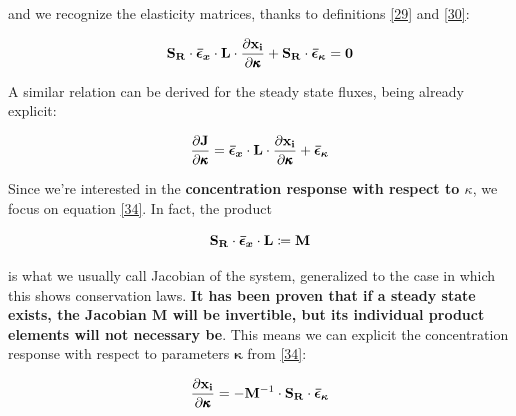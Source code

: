 \documentclass{article}
\begin{document}
	\begin{flushleft}
		and we recognize the elasticity matrices, thanks to definitions \eqref{29} and \eqref{30}:
	\end{flushleft}
	
	\begin{center}
		\begin{equation}
			\mathbf{S_R} \cdot \bm{\Bar{\epsilon}_x} \cdot \mathbf{L}
			\cdot \frac{\partial \mathbf{x_i}}{\partial \pmb{\kappa}}
			+ \mathbf{S_R} \cdot \bm{\Bar{\epsilon}_{\kappa}} = \mathbf{0}
			\label{34}
		\end{equation}
	\end{center}
	
	\begin{flushleft}
		A similar relation can be derived for the steady state fluxes, being already explicit:
	\end{flushleft}
	
	\begin{center}
		\begin{equation}
			\frac{\partial \mathbf{J}}{\partial \pmb{\kappa}}=\bm{\Bar{\epsilon}_x} \cdot \mathbf{L} \cdot 
			\frac{\partial \mathbf{x_i}}{\partial \pmb{\kappa}}+\bm{\Bar{\epsilon}_{\kappa}}
		\end{equation}
	\end{center}
	
	Since we're interested in the \textbf{concentration response with respect to $\kappa$}, we focus on equation \eqref{34}. In fact, the product
	
	\begin{center}
		\begin{equation}
			\mathbf{S_R} \cdot \bm{\Bar{\epsilon}_x} \cdot \mathbf{L} \coloneqq \mathbf{M}
		\end{equation}
	\end{center}
	
	\begin{flushleft}
		is what we usually call Jacobian of the system, generalized to the case in which this shows conservation laws. \textbf{It has been proven that if a steady state exists, the Jacobian $\mathbf{M}$ will be invertible, but its individual product elements will not necessary be}. This means we can explicit the concentration response with respect to parameters $\pmb{\kappa}$ from \eqref{34}:
	\end{flushleft}
	
	\begin{center}
		\begin{equation}
			\frac{\partial \mathbf{x_i}}{\partial \pmb{\kappa}}
			= -\mathbf{M}^{-1} \cdot \mathbf{S_R} \cdot \bm{\Bar{\epsilon}_{\kappa}}
		\end{equation}
	\end{center}
	
\end{document}
